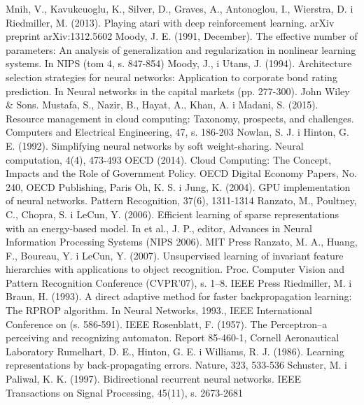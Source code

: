 \documentclass[12pt,a4paper,twoside]{article}
\begin{document}
\begin{thebibliography}{99}
 Mnih, V., Kavukcuoglu, K., Silver, D., Graves, A., Antonoglou, I., Wierstra, D. i Riedmiller, M. (2013). Playing atari with deep reinforcement learning. arXiv preprint arXiv:1312.5602
 Moody, J. E. (1991, December). The effective number of parameters: An analysis of generalization and regularization in nonlinear learning systems. In NIPS (tom 4, s. 847-854)
 Moody, J., i Utans, J. (1994). Architecture selection strategies for neural networks: Application to corporate bond rating prediction. In Neural networks in the capital markets (pp. 277-300). John Wiley \& Sons.
 Mustafa, S., Nazir, B., Hayat, A., Khan, A. i Madani, S. (2015). Resource management in cloud computing: Taxonomy, prospects, and challenges. Computers and Electrical Engineering, 47, s. 186-203
 Nowlan, S. J. i Hinton, G. E. (1992). Simplifying neural networks by soft weight-sharing. Neural computation, 4(4), 473-493
 OECD (2014). Cloud Computing: The Concept, Impacts and the Role of Government Policy. OECD Digital Economy Papers, No. 240, OECD Publishing, Paris
 Oh, K. S. i Jung, K. (2004). GPU implementation of neural networks. Pattern Recognition, 37(6), 1311-1314
 Ranzato, M., Poultney, C., Chopra, S. i LeCun, Y. (2006). Efficient learning of sparse representations with an energy-based model. In et al., J. P., editor, Advances in Neural Information Processing Systems (NIPS 2006). MIT Press
 Ranzato, M. A., Huang, F., Boureau, Y. i LeCun, Y. (2007). Unsupervised learning of invariant feature hierarchies with applications to object recognition. Proc. Computer Vision and Pattern Recognition Conference (CVPR’07), s. 1–8. IEEE Press
 Riedmiller, M. i Braun, H. (1993). A direct adaptive method for faster backpropagation learning: The RPROP algorithm. In Neural Networks, 1993., IEEE International Conference on (s. 586-591). IEEE
 Rosenblatt, F. (1957). The Perceptron--a perceiving and recognizing automaton. Report 85-460-1, Cornell Aeronautical Laboratory
 Rumelhart, D. E., Hinton, G. E. i Williams, R. J. (1986). Learning representations by back-propagating errors. Nature, 323, 533-536
 Schuster, M. i Paliwal, K. K. (1997). Bidirectional recurrent neural networks. IEEE Transactions on Signal Processing, 45(11), s. 2673-2681

\end{thebibliography}
\end{document}
